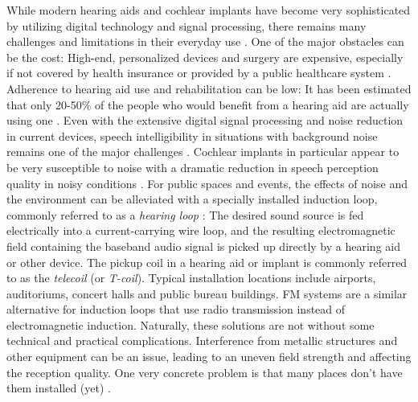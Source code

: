 \documentclass[english, 12pt, a4paper, pdftex, elec, utf8]{aaltothesis}
\begin{document}
While modern hearing aids and cochlear implants have become very sophisticated by utilizing digital technology and signal processing, there remains many challenges and limitations in their everyday use \cite{levitt2007historical}. One of the major obstacles can be the cost: High-end, personalized devices and surgery are expensive, especially if not covered by health insurance or provided by a public healthcare system \cite{wilson2017global}. Adherence to hearing aid use and rehabilitation can be low: It has been estimated that only 20-50\% of the people who would benefit from a hearing aid are actually using one \cite{koskela2013kuulokojeen}. Even with the extensive digital signal processing and noise reduction in current devices, speech intelligibility in situations with background noise remains one of the major challenges \cite{healy2016difficulty, levitt2007historical, goehring2016speech}. Cochlear implants in particular appear to be very susceptible to noise with a dramatic reduction in speech perception quality in noisy conditions \cite{ healy2016difficulty, friesen2001speech, fu2005noise, srinivasan2013improving}. For public spaces and events, the effects of noise and the environment can be alleviated with a specially installed induction loop, commonly referred to as a \textit{hearing loop} \cite{salonen2013hearing}: The desired sound source is fed electrically into a current-carrying wire loop, and the resulting electromagnetic field containing the baseband audio signal is picked up directly by a hearing aid or other device. The pickup coil in a hearing aid or implant is commonly referred to as the \textit{telecoil} (or \textit{T-coil}). Typical installation locations include airports, auditoriums, concert halls and public bureau buildings. FM systems are a similar alternative for induction loops that use radio transmission instead of electromagnetic induction. Naturally, these solutions are not without some technical and practical complications. Interference from metallic structures and other equipment can be an issue, leading to an uneven field strength and affecting the reception quality. One very concrete problem is that many places don't have them installed (yet) \cite{wilson2017global, healy2016difficulty}. \\\\
\end{document}
